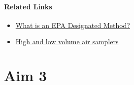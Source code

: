 \documentclass{article}
\begin{document}
\paragraph{Related Links}
\begin{itemize}
    \item \href{http://themetoneinstrumentsmonitor.blogspot.com/2012/01/what-is-epa-designated-method.html}{What is an EPA Designated Method?}
    \item \href{https://www.qld.gov.au/environment/pollution/monitoring/air-pollution/samplers}{High and low volume air samplers}
\end{itemize}


\section{Aim 3}
\end{document}
